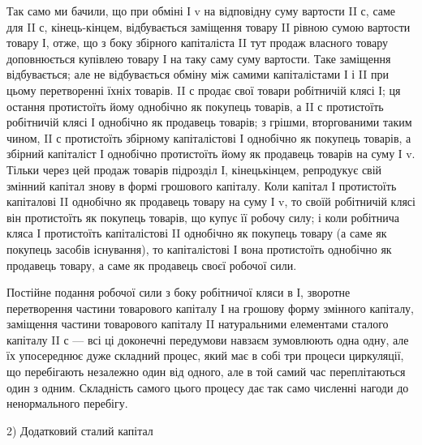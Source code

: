 Так само ми бачили, що при обміні І v на відповідну суму вартости
II с, саме для II с, кінець-кінцем, відбувається заміщення товару II
рівною сумою вартости товару І, отже, що з боку збірного капіталіста
II тут продаж власного товару доповнюється купівлею товару І на
таку саму суму вартости. Таке заміщення відбувається; але не відбувається
обміну між самими капіталістами І і II при цьому перетворенні
їхніх товарів. II с продає свої товари робітничій клясі І; ця остання
протистоїть йому однобічно як покупець товарів, а II с протистоїть робітничій
клясі І однобічно як продавець товарів; з грішми, вторгованими
таким чином, II с протистоїть збірному капіталістові І однобічно як покупець
товарів, а збірний капіталіст І однобічно протистоїть йому як продавець
товарів на суму І v. Тільки через цей продаж товарів підрозділ І, кінецькінцем,
репродукує свій змінний капітал знову в формі грошового капіталу.
Коли капітал І протистоїть капіталові II однобічно як продавець
товару на суму І v, то своїй робітничій клясі він протистоїть як покупець
товарів, що купує її робочу силу; і коли робітнича кляса І протистоїть
капіталістові II однобічно як покупець товару (а саме як покупець
засобів існування), то капіталістові І вона протистоїть однобічно як продавець
товару, а саме як продавець своєї робочої сили.

Постійне подання робочої сили з боку робітничої кляси в І, зворотне
перетворення частини товарового капіталу І на грошову форму змінного
капіталу, заміщення частини товарового капіталу II натуральними елементами
сталого капіталу II с — всі ці доконечні передумови навзаєм зумовлюють
одна одну, але їх упосереднює дуже складний процес, який
має в собі три процеси циркуляції, що перебігають незалежно один від
одного, але в той самий час переплітаються один з одним. Складність самого
цього процесу дає так само численні нагоди до ненормального перебігу.

2) Додатковий сталий капітал

